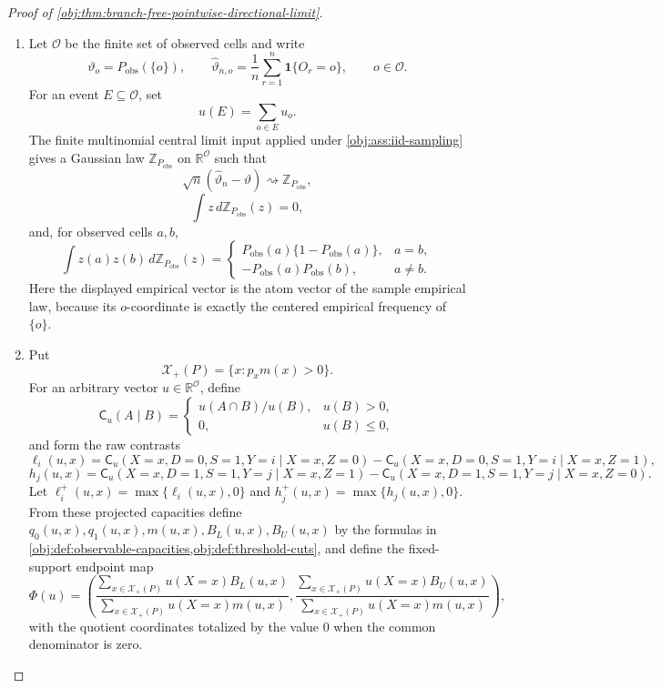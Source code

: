 \begin{proof}[Proof of \cref{obj:thm:branch-free-pointwise-directional-limit}]
\begin{enumerate}
\item Let \(\mathcal O\) be the finite set of observed cells and write
\[
\vartheta_o=P_{\mathrm{obs}}(\{o\}),
\qquad
\widehat\vartheta_{n,o}
=
\frac1n\sum_{r=1}^n\mathbf 1\{O_r=o\},
\qquad o\in\mathcal O .
\]
For an event \(E\subseteq\mathcal O\), set
\[
u(E)=\sum_{o\in E}u_o .
\]
The finite multinomial central limit input applied under \cref{obj:ass:iid-sampling} gives a Gaussian law \(\mathbb Z_{P_{\mathrm{obs}}}\) on \(\mathbb R^{\mathcal O}\) such that
\[
\sqrt n(\widehat\vartheta_n-\vartheta)\rightsquigarrow
\mathbb Z_{P_{\mathrm{obs}}},
\]
\[
\int z\,d\mathbb Z_{P_{\mathrm{obs}}}(z)=0,
\]
and, for observed cells \(a,b\),
\[
\int z(a)z(b)\,d\mathbb Z_{P_{\mathrm{obs}}}(z)
=
\begin{cases}
P_{\mathrm{obs}}(a)\{1-P_{\mathrm{obs}}(a)\},&a=b,\\
-P_{\mathrm{obs}}(a)P_{\mathrm{obs}}(b),&a\ne b.
\end{cases}
\]
Here the displayed empirical vector is the atom vector of the sample empirical law, because its \(o\)-coordinate is exactly the centered empirical frequency of \(\{o\}\). %

\item Put
\[
\mathcal X_+(P)=\{x:p_xm(x)>0\}.
\]
For an arbitrary vector \(u\in\mathbb R^{\mathcal O}\), define
\[
\mathsf C_u(A\mid B)=
\begin{cases}
u(A\cap B)/u(B),&u(B)>0,\\
0,&u(B)\le0,
\end{cases}
\]
and form the raw contrasts
\[
\ell_i(u,x)
=
\mathsf C_u(X=x,D=0,S=1,Y=i\mid X=x,Z=0)
-
\mathsf C_u(X=x,D=0,S=1,Y=i\mid X=x,Z=1),
\]
\[
h_j(u,x)
=
\mathsf C_u(X=x,D=1,S=1,Y=j\mid X=x,Z=1)
-
\mathsf C_u(X=x,D=1,S=1,Y=j\mid X=x,Z=0).
\]
Let \(\ell_i^+(u,x)=\max\{\ell_i(u,x),0\}\) and
\(h_j^+(u,x)=\max\{h_j(u,x),0\}\). From these projected capacities define
\(q_0(u,x),q_1(u,x),m(u,x),B_L(u,x),B_U(u,x)\) by the formulas in
\cref{obj:def:observable-capacities,obj:def:threshold-cuts}, and define the fixed-support endpoint map
\[
\Phi(u)
=
\left(
\frac{\sum_{x\in\mathcal X_+(P)}u(X=x)B_L(u,x)}
{\sum_{x\in\mathcal X_+(P)}u(X=x)m(u,x)},
\frac{\sum_{x\in\mathcal X_+(P)}u(X=x)B_U(u,x)}
{\sum_{x\in\mathcal X_+(P)}u(X=x)m(u,x)}
\right),
\]
with the quotient coordinates totalized by the value \(0\) when the common denominator is zero. %


\end{enumerate}
\end{proof}
